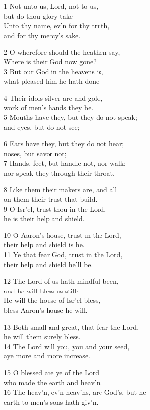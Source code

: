 1 Not unto us, Lord, not to us,\\
but do thou glory take\\
Unto thy name, ev’n for thy truth,\\
and for thy mercy’s sake.

2 O wherefore should the heathen say,\\
Where is their God now gone?\\
3 But our God in the heavens is,\\
what pleased him he hath done.

4 Their idols silver are and gold,\\
work of men’s hands they be.\\
5 Mouths have they, but they do not speak;\\
and eyes, but do not see;

6 Ears have they, but they do not hear;\\
noses, but savor not;\\
7 Hands, feet, but handle not, nor walk;\\
nor speak they through their throat.

8 Like them their makers are, and all\\
on them their trust that build.\\
9 O Isr’el, trust thou in the Lord,\\
he is their help and shield.

10 O Aaron’s house, trust in the Lord,\\
their help and shield is he.\\
11 Ye that fear God, trust in the Lord,\\
their help and shield he’ll be.

12 The Lord of us hath mindful been,\\
and he will bless us still:\\
He will the house of Isr’el bless,\\
bless Aaron’s house he will.

13 Both small and great, that fear the Lord,\\
he will them surely bless.\\
14 The Lord will you, you and your seed,\\
aye more and more increase.

15 O blessed are ye of the Lord,\\
who made the earth and heav’n.\\
16 The heav’n, ev’n heav’ns, are God’s, but he\\
earth to men’s sons hath giv’n.

